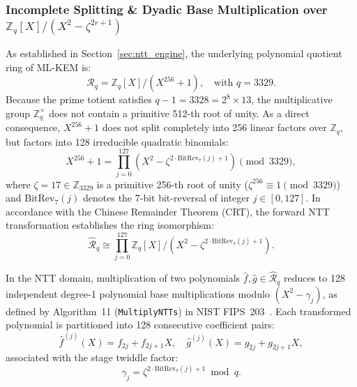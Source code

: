 \subsubsection{Incomplete Splitting \& Dyadic Base Multiplication over \texorpdfstring{$\mathbb{Z}_q[X]/(X^2 - \zeta^{2r+1})$}{Z\_q[X]/(X\textasciicircum 2 - \textbackslash zeta\textasciicircum \{2r+1\})}}
\label{sec05b_dyadic_basemul}

As established in Section~\ref{sec:ntt_engine}, the underlying polynomial quotient ring of \mbox{ML-KEM} is:
\begin{equation}
\label{eq:rq_def_sec5b}
\mathcal{R}_q = \mathbb{Z}_q[X] / (X^{256} + 1), \quad \text{with } q = 3329.
\end{equation}
Because the prime totient satisfies $q - 1 = 3328 = 2^8 \times 13$, the multiplicative group $\mathbb{Z}_q^\times$ does not contain a primitive 512-th root of unity. As a direct consequence, $X^{256} + 1$ does not split completely into 256 linear factors over $\mathbb{Z}_q$, but factors into 128 irreducible quadratic binomials:
\begin{equation}
\label{eq:poly_factorization_sec5b}
X^{256} + 1 = \prod_{j=0}^{127} \left( X^2 - \zeta^{2 \cdot \text{BitRev}_7(j) + 1} \right) \pmod{3329},
\end{equation}
where $\zeta = 17 \in \mathbb{Z}_{3329}$ is a primitive 256-th root of unity ($\zeta^{256} \equiv 1 \pmod{3329}$) and $\text{BitRev}_7(j)$ denotes the 7-bit bit-reversal of integer $j \in [0, 127]$. In accordance with the Chinese Remainder Theorem (CRT), the forward NTT transformation establishes the ring isomorphism:
\begin{equation}
\label{eq:ntt_isomorphism_sec5b}
\hat{\mathcal{R}}_q \cong \prod_{j=0}^{127} \mathbb{Z}_q[X] / \left( X^2 - \zeta^{2 \cdot \text{BitRev}_7(j) + 1} \right).
\end{equation}

In the NTT domain, multiplication of two polynomials $\hat{f}, \hat{g} \in \hat{\mathcal{R}}_q$ reduces to 128 independent degree-1 polynomial base multiplications modulo $(X^2 - \gamma_j)$, as defined by Algorithm~11 (\texttt{MultiplyNTTs}) in NIST FIPS~203~\cite{fips203}. Each transformed polynomial is partitioned into 128 consecutive coefficient pairs:
\begin{equation}
\hat{f}^{(j)}(X) = f_{2j} + f_{2j+1}X, \quad \hat{g}^{(j)}(X) = g_{2j} + g_{2j+1}X,
\end{equation}
associated with the stage twiddle factor:
\begin{equation}
\label{eq:twiddle_gamma_sec5b}
\gamma_j = \zeta^{2 \cdot \text{BitRev}_7(j) + 1} \bmod q.
\end{equation}

